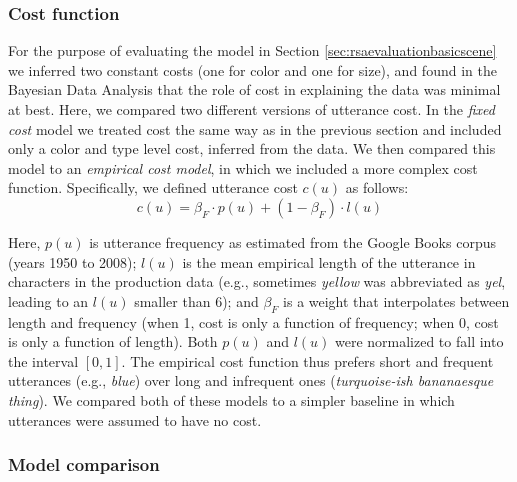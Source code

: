 \documentclass[11pt]{article}
\newcommand{\sectionref}[1]{Section \ref{#1}}
\begin{document}
\subsubsection{Cost function}

For the purpose of evaluating the model in \sectionref{sec:rsaevaluationbasicscene} we inferred two constant costs (one for color and one for size), and found in the Bayesian Data Analysis that the role of cost in explaining the data was minimal at best. Here, we compared two different versions of utterance cost. In the \emph{fixed cost} model we treated cost the same way as in the previous section and included only a color and type level cost, inferred from the data. We then compared this model to an \emph{empirical cost model}, in which we included a more complex cost function. 
Specifically, we defined utterance cost $c(u)$ as follows:
\begin{equation}
c(u) = \beta_F\cdot p(u) + (1-\beta_F)\cdot l(u)
\end{equation}

Here, $p(u)$ is utterance frequency as estimated from the Google Books corpus (years 1950 to 2008); $l(u)$ is the mean empirical length of the utterance in characters in the production data (e.g., sometimes \emph{yellow} was abbreviated as \emph{yel}, leading to an $l(u)$ smaller than 6); and $\beta_F$ is a weight that interpolates between length and frequency (when 1, cost is only a function of frequency; when 0, cost is only a function of length). Both $p(u)$ and $l(u)$ were normalized to fall into the interval $[0,1]$. The empirical cost function thus prefers short and frequent utterances (e.g., \emph{blue}) over long and infrequent ones (\emph{turquoise-ish bananaesque thing}).
We compared both of these models to a simpler baseline in which utterances were assumed to have no cost.

\subsubsection{Model comparison}
\end{document}
